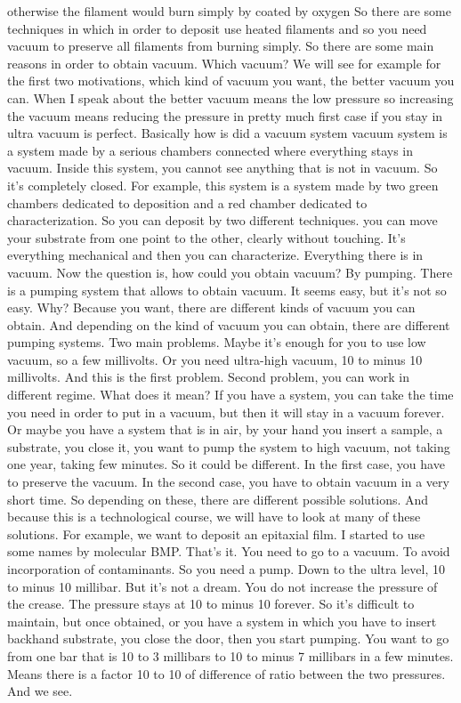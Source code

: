 otherwise the filament would burn simply by coated by oxygen So there are some techniques in which in order to deposit use heated filaments and so you need vacuum to preserve all filaments from burning simply. So there are some main reasons in order to obtain vacuum. Which vacuum? We will see for example for the first two motivations, which kind of vacuum you want, the better vacuum you can. When I speak about the better vacuum means the low pressure so increasing the vacuum means reducing the pressure in pretty much first case if you stay in ultra vacuum is perfect.
Basically how is did a vacuum system vacuum system is a system made by a serious chambers connected where everything stays in vacuum. Inside this system, you cannot see anything that is not in vacuum. So it's completely closed. For example, this system is a system made by two green chambers dedicated to deposition and a red chamber dedicated to characterization. So you can deposit by two different techniques. you can move your substrate from one point to the other, clearly without touching. It's everything mechanical and then you can characterize. Everything there is in vacuum. Now the question is, how could you obtain vacuum? By pumping. There is a pumping system that allows to obtain vacuum. It seems easy, but it's not so easy. Why? Because you want, there are different kinds of vacuum you can obtain. And depending on the kind of vacuum you can obtain, there are different pumping systems. Two main problems. Maybe it's enough for you to use low vacuum, so a few millivolts. Or you need ultra-high vacuum, 10 to minus 10 millivolts. And this is the first problem. Second problem, you can work in different regime. What does it mean? If you have a system, you can take the time you need in order to put in a vacuum, but then it will stay in a vacuum forever. Or maybe you have a system that is in air, by your hand you insert a sample, a substrate, you close it, you want to pump the system to high vacuum, not taking one year, taking few minutes. So it could be different. In the first case, you have to preserve the vacuum. In the second case, you have to obtain vacuum in a very short time. So depending on these, there are different possible solutions. And because this is a technological course, we will have to look at many of these solutions. For example, we want to deposit an epitaxial film. I started to use some names by molecular BMP. That's it. You need to go to a vacuum. To avoid incorporation of contaminants. So you need a pump. Down to the ultra level, 10 to minus 10 millibar. But it's not a dream. You do not increase the pressure of the crease. The pressure stays at 10 to minus 10 forever. So it's difficult to maintain, but once obtained, or you have a system in which you have to insert backhand substrate, you close the door, then you start pumping. You want to go from one bar that is 10 to 3 millibars to 10 to minus 7 millibars in a few minutes. Means there is a factor 10 to 10 of difference of ratio between the two pressures. And we see.
